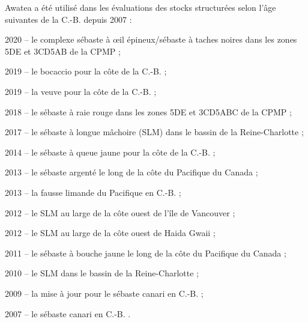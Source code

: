 \documentclass[11pt]{book}
\begin{document}
Awatea a \'{e}t\'{e} utilis\'{e} dans les \'{e}valuations des stocks structur\'{e}es selon l'\^{a}ge suivantes de la C.-B. depuis 2007 :
\begin{itemize_csas}{}{}
\item 2020 -- le complexe s\'{e}baste \`{a} {\oe}il \'{e}pineux/s\'{e}baste \`{a} taches noires dans les zones 5DE et 3CD5AB de la CPMP \citep{Starr-Haigh:2022_rebs};
\item 2019 -- le bocaccio pour la c\^{o}te de la C.-B. \citep{Starr-Haigh:2022_bor};
\item 2019 -- la veuve pour la c\^{o}te de la C.-B. \citep{Starr-Haigh:2021_wwr};
\item 2018 -- le s\'{e}baste \`{a} raie rouge dans les zones 5DE et 3CD5ABC de la CPMP \citep{Starr-Haigh:2021_rsr};
\item 2017 -- le s\'{e}baste \`{a} longue m\^{a}choire (SLM) dans le bassin de la Reine-Charlotte \citep{Haigh-etal:2018_pop5ABC};
\item 2014 -- le s\'{e}baste \`{a} queue jaune pour la c\^{o}te de la C.-B. \citep{DFO-SAR:2015_ytr};
\item 2013 -- le s\'{e}baste argent\'{e} le long de la c\^{o}te du Pacifique du Canada \citep{Starr-etal:2016_sgr};
\item 2013 -- la fausse limande du Pacifique en C.-B. \citep{Holt-etal:2016_rol};
\item 2012 -- le SLM au large de la c\^{o}te ouest de l'\^{i}le de Vancouver \citep{Edwards-etal:2014_pop3CD};
\item 2012 -- le SLM au large de la c\^{o}te ouest de Haida Gwaii \citep{Edwards-etal:2014_pop5DE};
\item 2011 -- le s\'{e}baste \`{a} bouche jaune le long de la c\^{o}te du Pacifique du Canada \citep{Edwards-etal:2012_ymr};
\item 2010 -- le SLM dans le bassin de la Reine-Charlotte \citep{Edwards-etal:2012_pop5ABC};
\item 2009 -- la mise \`{a} jour pour le s\'{e}baste canari en C.-B. \citep{DFO-SR:2009_car};
\item 2007 -- le s\'{e}baste canari en C.-B. \citep{Stanley-etal:2009_car}.
\end{itemize_csas}
\end{document}
